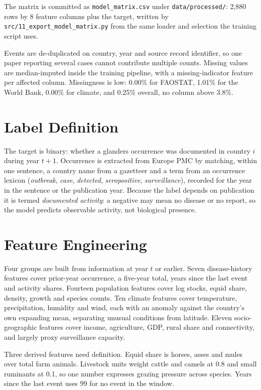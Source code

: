 \documentclass[10pt,openany]{report}
\begin{document}
The matrix is committed as \texttt{model\_matrix.csv} under \texttt{data/}\allowbreak\texttt{processed/}:
2,880 rows by 8 feature columns plus the target, written by
\texttt{src/11\_export\_model\_matrix.py} from the same loader and selection the training script uses.

Events are de-duplicated on country, year and source record identifier, so one paper reporting
several cases cannot contribute multiple counts. Missing values are median-imputed inside the training
pipeline, with a missing-indicator feature per affected column. Missingness is low: 0.00\% for
FAOSTAT, 1.01\% for the World Bank, 0.00\% for climate, and 0.25\% overall, no column above
3.8\%.

\section{Label Definition}

The target is binary: whether a glanders occurrence was documented in country $i$ during year $t+1$.
Occurrence is extracted from Europe PMC by matching, within one sentence, a country name from a
gazetteer and a term from an occurrence lexicon (\emph{outbreak}, \emph{case}, \emph{detected},
\emph{seropositive}, \emph{surveillance}), recorded for the year in the sentence or the publication
year. Because the label depends on publication it is termed \emph{documented activity}: a negative may
mean no disease or no report, so the model predicts observable activity, not biological presence.

\section{Feature Engineering}

Four groups are built from information at year $t$ or earlier. Seven disease-history features cover
prior-year occurrence, a five-year total, years since the last event and activity shares. Fourteen
population features cover log stocks, equid share, density, growth and species counts. Ten climate
features cover temperature, precipitation, humidity and wind, each with an anomaly against the
country's own expanding mean, separating unusual conditions from latitude. Eleven socio-geographic
features cover income, agriculture, GDP, rural share and connectivity, and largely proxy surveillance
capacity.

Three derived features need definition. Equid share is horses, asses and mules over total farm animals.
Livestock units weight cattle and camels at 0.8 and small ruminants at 0.1, so one number expresses
grazing pressure across species. Years since the last event uses 99 for no event in the window.
\end{document}
